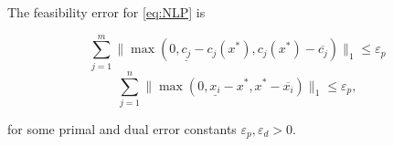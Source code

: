 The feasibility error for \eqref{eq:NLP} is

\begin{equation}
\sum\limits_{j=1}^m \bigg\lVert \max(0, \underline{c_j} - c_j(x^*), c_j(x^*) - \overline{c_j}) \bigg\rVert_1 \le \varepsilon_p
\end{equation}
\begin{equation}
\sum\limits_{j=1}^n \bigg\lVert \max(0, \underline{x_i} - x^*, x^* - \overline{x_i}) \bigg\rVert_1 \le \varepsilon_p ,
\end{equation}

for some primal and dual error constants $\varepsilon_p,  \varepsilon_d > 0$.
